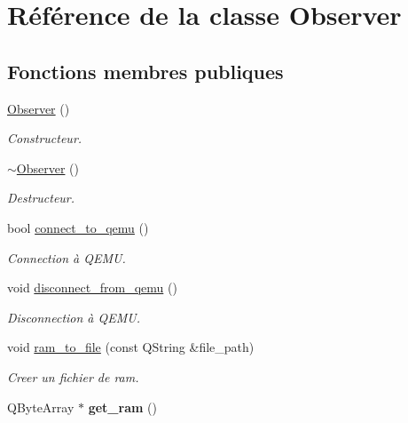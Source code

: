 \hypertarget{classObserver}{
\section{Référence de la classe Observer}
\label{classObserver}
}
\subsection*{Fonctions membres publiques}
\begin{DoxyCompactItemize}
\item 
\hyperlink{classObserver_a19c43f80a38a332a6f694783df3c9835}{Observer} ()
\begin{DoxyCompactList}\small\item\em Constructeur. \item\end{DoxyCompactList}\item 
\hypertarget{classObserver_a450645e61c136826f09940a1334c7f34}{
\hyperlink{classObserver_a450645e61c136826f09940a1334c7f34}{$\sim$Observer} ()}
\label{classObserver_a450645e61c136826f09940a1334c7f34}

\begin{DoxyCompactList}\small\item\em Destructeur. \item\end{DoxyCompactList}\item 
bool \hyperlink{classObserver_ad1d517ca2d4eaca45cc4c3826224bdf0}{connect\_\-to\_\-qemu} ()
\begin{DoxyCompactList}\small\item\em Connection à QEMU. \item\end{DoxyCompactList}\item 
void \hyperlink{classObserver_af087ba1fc5058af1085cc19dd592dae7}{disconnect\_\-from\_\-qemu} ()
\begin{DoxyCompactList}\small\item\em Disconnection à QEMU. \item\end{DoxyCompactList}\item 
void \hyperlink{classObserver_a2429a0ceee3eda2e1a51e8696b0063de}{ram\_\-to\_\-file} (const QString \&file\_\-path)
\begin{DoxyCompactList}\small\item\em Creer un fichier de ram. \item\end{DoxyCompactList}\item 
\hypertarget{classObserver_a94ce174d2c4992ed3145f37f45bf5799}{
QByteArray $\ast$ {\bfseries get\_\-ram} ()}
\label{classObserver_a94ce174d2c4992ed3145f37f45bf5799}


\end{DoxyCompactItemize}
